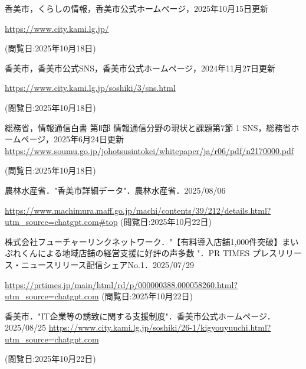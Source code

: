\begin{thebibliography}{99}
     香美市，くらしの情報，香美市公式ホームページ，2025年10月15日更新 
    
    \url{https://www.city.kami.lg.jp/}

    (閲覧日:2025年10月18日)
    
     香美市，香美市公式SNS，香美市公式ホームページ，2024年11月27日更新 
    
    \url{https://www.city.kami.lg.jp/soshiki/3/sns.html}

    (閲覧日:2025年10月18日) 
    
     総務省，情報通信白書 第Ⅱ部 情報通信分野の現状と課題第7節 1 SNS，総務省ホームページ，2025年6月24日更新
    \url{https://www.soumu.go.jp/johotsusintokei/whitepaper/ja/r06/pdf/n2170000.pdf}

    (閲覧日:2025年10月18日) 

     農林水産省．"香美市詳細データ"．農林水産省．2025/08/06

    \url{https://www.machimura.maff.go.jp/machi/contents/39/212/details.html?utm_source=chatgpt.com#top}
    (閲覧日:2025年10月22日) 

     株式会社フューチャーリンクネットワーク．"【有料導入店舗1,000件突破】まいぷれくんによる地域店舗の経営支援に好評の声多数 "．PR TIMES プレスリリース・ニュースリリース配信シェアNo.1．2025/07/29
    
    \url{https://prtimes.jp/main/html/rd/p/000000388.000058260.html?utm_source=chatgpt.com}
    (閲覧日:2025年10月22日)

     香美市．"IT企業等の誘致に関する支援制度"．香美市公式ホームページ．2025/08/25
    \url{https://www.city.kami.lg.jp/soshiki/26-1/kigyouyuuchi.html?utm_source=chatgpt.com}

    (閲覧日:2025年10月22日)


    




\end{thebibliography}